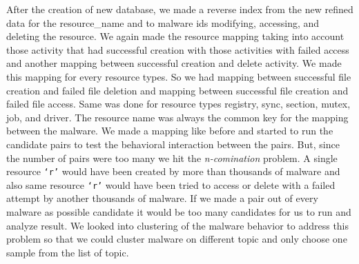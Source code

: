 After the creation of new database, we made a reverse index from the new refined data for the resource\_name and to malware ids modifying, accessing, and deleting the resource.
We again made the resource mapping taking into account those activity that had successful creation with those activities with failed access and another mapping between successful creation and delete activity.
We made this mapping for every resource types. So we had mapping between successful file creation and failed file deletion and mapping between successful file creation and failed file access.
Same was done for resource types registry, sync, section, mutex, job, and driver. The resource name was always the common key for the mapping between the malware.
We made a mapping like before and started to run the candidate pairs to test the behavioral interaction between the pairs. But, since the number of pairs were too many we hit the \emph{n-comination} problem.
A single resource \texttt{`r'} would have been created by more than thousands of malware and also same resource \texttt{`r'} would have been tried to access or delete with a failed attempt by another thousands of malware. If we made a pair out of every malware as possible candidate it would be too many candidates for us to run and analyze result.
We looked into clustering of the malware behavior to address this problem so that we could cluster malware on different topic and only choose one sample from the list of topic.
